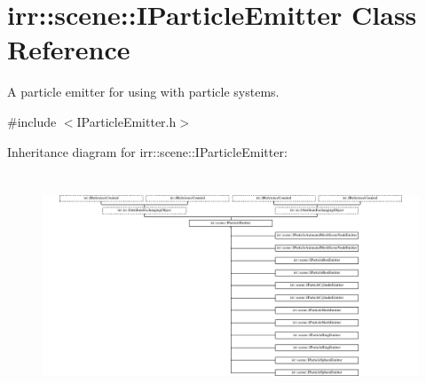 \hypertarget{classirr_1_1scene_1_1IParticleEmitter}{}\section{irr\+:\+:scene\+:\+:I\+Particle\+Emitter Class Reference}
\label{classirr_1_1scene_1_1IParticleEmitter}


A particle emitter for using with particle systems.  




{\ttfamily \#include $<$I\+Particle\+Emitter.\+h$>$}

Inheritance diagram for irr\+:\+:scene\+:\+:I\+Particle\+Emitter\+:\begin{figure}[H]
\begin{center}
\leavevmode
\includegraphics[height=6.730770cm]{classirr_1_1scene_1_1IParticleEmitter}
\end{center}
\end{figure}
